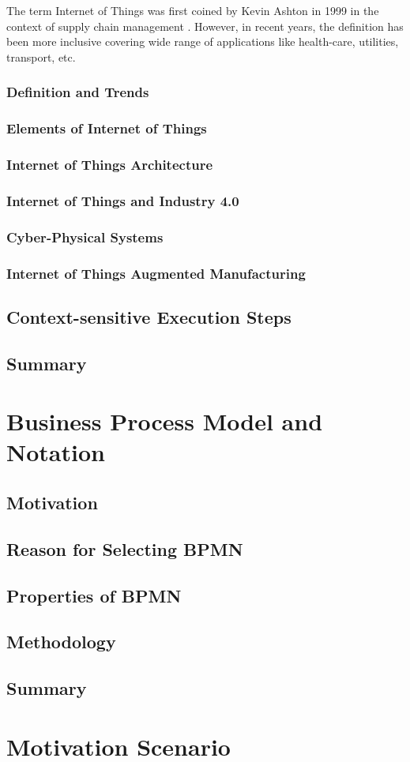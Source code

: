 The term Internet of Things was first coined by Kevin Ashton in 1999 in the context of supply chain management \cite{IOTFIRST}. However, in recent years, the definition has been more inclusive covering wide range of applications like health-care, utilities, transport, etc.
\subsection{Definition and Trends}
\subsection{Elements of Internet of Things}
\subsection{Internet of Things Architecture}
\subsection{Internet of Things and Industry 4.0}
\subsection{Cyber-Physical Systems} \label{CPS}
\subsection{Internet of Things Augmented Manufacturing}
\section{Context-sensitive Execution Steps}\label{conces}
\section{Summary}

\chapter{Business Process Model and Notation} \label{chap:bpmn}
\section{Motivation}
\section{Reason for Selecting BPMN}
\section{Properties of BPMN}
\section{Methodology}
\section{Summary}
\chapter{Motivation Scenario} \label{chap:motscene}